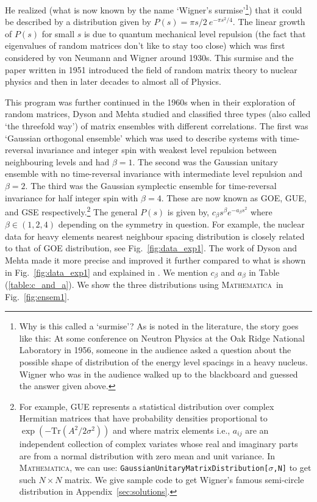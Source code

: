 \documentclass[letter,11pt]{article}
\newcommand{\MA}{\textsc{Mathematica}}
\begin{document}
He realized (what is now known by the name `Wigner's surmise'\footnote{Why is this called a `surmise'? 
As is noted in the literature, the story goes like this: At some conference on Neutron Physics at the Oak 
Ridge National Laboratory in 1956, someone in the audience asked a question about the possible shape 
of distribution of the energy level spacings in a heavy nucleus. Wigner who was in the audience 
walked up to the blackboard and guessed the answer given above.}) that it could be described by a distribution given by $P(s) = \pi s/2~e^{-\pi s^2/4}$. 
The linear growth of $P(s)$ for small $s$ is due to quantum mechanical level repulsion (the fact that eigenvalues of random matrices don't like to stay too close)
which was first considered by von Neumann and Wigner around 1930s. 
This surmise and the paper written in 1951
\cite{Wigner1951OnTS} introduced the field of random matrix theory 
to nuclear physics and then in later decades to almost all of Physics.

This program was further continued in the 1960s when in their exploration of random matrices, Dyson and Mehta studied and classified three types (also called `the threefold way') of matrix ensembles with different correlations. The first was `Gaussian orthogonal ensemble' which was used to describe systems with time-reversal invariance and integer spin with weakest level repulsion between neighbouring levels and had $\beta=1$. The second was the Gaussian unitary ensemble with no time-reversal invariance with intermediate level repulsion and $\beta=2$. The third was the Gaussian symplectic ensemble for time-reversal invariance for half integer spin with $\beta=4$. These are now known as GOE, GUE, and GSE respectively.\footnote{For example, GUE represents a statistical distribution over complex Hermitian matrices 
that have probability densities proportional to $ \exp(-\mbox{Tr}(A^2/2\sigma^2))$ and
where matrix elements i.e., $a_{ij}$ are an independent collection of complex 
variates whose real and imaginary parts are from a normal distribution
with zero mean and unit variance. In \MA, we can use: 
\texttt{GaussianUnitaryMatrixDistribution[$\sigma$,N]}
to get such $N \times N$ matrix. We give sample code to get Wigner's famous semi-circle distribution in Appendix~\ref{sec:solutions}.} 
The general $P(s)$ is given by, $c_{\beta}s^{\beta} e^{-a_{\beta}s^2}$ 
where $\beta \in (1,2,4)$ depending on the symmetry in question. 
For example, the nuclear data for heavy elements nearest neighbour spacing distribution
is closely related to that of GOE distribution, see Fig.~\ref{fig:data_exp1}. 
The work of Dyson and Mehta made it more precise and improved it further 
compared to what is shown in Fig.~\ref{fig:data_exp1} and explained in 
\cite{PhysRevLett.48.1086}. We mention $c_{\beta}$ and  $a_{\beta}$ in Table (\ref{table:c_and_a}). 
We show the three distributions using \MA~in Fig.~\ref{fig:ensem1}.  
\end{document}
